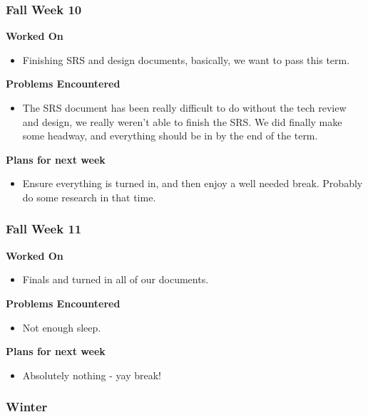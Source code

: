 \documentclass[compsoc,draftclsnofoot,onecolumn,10pt]{IEEEtran}
\begin{document}
\subsubsection*{Fall Week 10}
\textbf{Worked On}
\begin{itemize}
    \item Finishing SRS and design documents, basically, we want to pass this term.
\end{itemize}
\textbf{Problems Encountered}
\begin{itemize}
    \item The SRS document has been really difficult to do without the tech review and design, we really weren't able to finish the SRS. We did finally make some headway, and everything should be in by the end of the term.
\end{itemize}
\textbf{Plans for next week}
\begin{itemize}
    \item Ensure everything is turned in, and then enjoy a well needed break. Probably do some research in that time.
\end{itemize}



\subsubsection*{Fall Week 11}
\textbf{Worked On}
\begin{itemize}
    \item Finals and turned in all of our documents.
\end{itemize}
\textbf{Problems Encountered}
\begin{itemize}
    \item Not enough sleep.
\end{itemize}
\textbf{Plans for next week}
\begin{itemize}
    \item Absolutely nothing - yay break!
\end{itemize}


\subsubsection{Winter}
\end{document}
